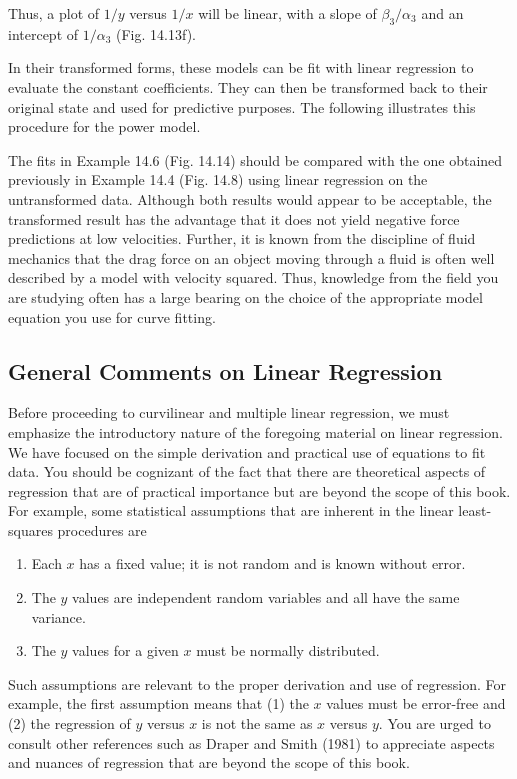 \documentclass[../main.tex]{subfiles}
\begin{document}
\noindent Thus, a plot of $1/y$ versus $1/x$ will be linear, with a slope of $\beta_3 / \alpha_3$ and an intercept of $1 / \alpha_3$ (Fig. 14.13f).

In their transformed forms, these models can be fit with linear regression to evaluate the constant coefficients. They can then be transformed back to their original state and used for predictive purposes. The following illustrates this procedure for the power model.



The fits in Example 14.6 (Fig. 14.14) should be compared with the one obtained previously in Example 14.4 (Fig. 14.8) using linear regression on the untransformed data. Although both results would appear to be acceptable, the transformed result has the advantage that it does not yield negative force predictions at low velocities. Further, it is known from the discipline of fluid mechanics that the drag force on an object moving through a fluid is often well described by a model with velocity squared. Thus, knowledge from the field you are studying often has a large bearing on the choice of the appropriate model equation you use for curve fitting.


\label{cha:cha_P_14_4_1}
\subsection{General Comments on Linear Regression}

\noindent Before proceeding to curvilinear and multiple linear regression, we must emphasize the introductory nature of the foregoing material on linear regression. We have focused on the simple derivation and practical use of equations to fit data. You should be cognizant of the fact that there are theoretical aspects of regression that are of practical importance but are beyond the scope of this book. For example, some statistical assumptions that are inherent in the linear least-squares procedures are

\begin{enumerate}
	\item Each $x$ has a fixed value; it is not random and is known without error.
	\item The $y$ values are independent random variables and all have the same variance.
	\item The $y$ values for a given $x$ must be normally distributed.
\end{enumerate}

Such assumptions are relevant to the proper derivation and use of regression. For example, the first assumption means that (1) the $x$ values must be error-free and (2) the regression of $y$ versus $x$ is not the same as $x$ versus $y$. You are urged to consult other references such as Draper and Smith (1981) to appreciate aspects and nuances of regression that are beyond the scope of this book.
\end{document}
